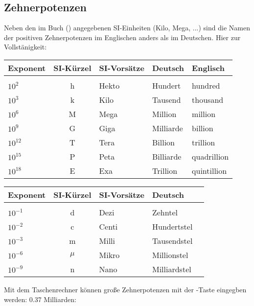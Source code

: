 \subsection{Zehnerpotenzen}


Neben den im Buch () angegebenen SI-Einheiten (Kilo, Mega, ...) sind die
Namen der positiven Zehnerpotenzen im Englischen anders als im
Deutschen. Hier zur Vollstänigkeit:

\begin{tabular}{lclll}
Exponent   & SI-Kürzel & SI-Vorsätze & Deutsch & Englisch\\
\hline\\
$10^{2}$   & h         & Hekto       & Hundert   & hundred\\
$10^{3}$   & k         & Kilo        & Tausend   & thousand\\
$10^{6}$   & M         & Mega        & Million   & million\\
$10^{9}$   & G         & Giga        & Milliarde & billion\\
$10^{12}$  & T         & Tera        & Billion   & trillion\\
$10^{15}$  & P         & Peta        & Billiarde & quadrillion\\
$10^{18}$  & E         & Exa         & Trillion  & quintillion\\
\end{tabular}

\begin{tabular}{lclll}
Exponent   & SI-Kürzel & SI-Vorsätze & Deutsch\\
\hline\\
$10^{-1}$  & d         & Dezi        & Zehntel\\
$10^{-2}$  & c         & Centi       & Hundertstel\\
$10^{-3}$  & m         & Milli       & Tausendstel\\
$10^{-6}$  & $\mu$     & Mikro       & Millionstel\\
$10^{-9}$  & n         & Nano        & Milliardstel\\
\end{tabular}

Mit dem Taschenrechner können große Zehnerpotenzen mit der
  -Taste eingegben
  werden: 0.37 Milliarden:

